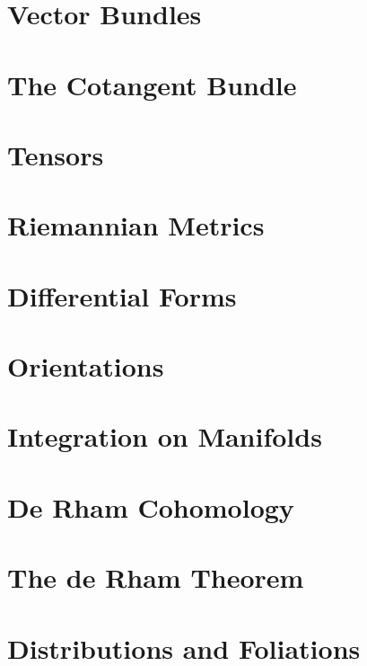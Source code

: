 \chapter{Vector Bundles}
\label{chap:vector-bundles}


\chapter{The Cotangent Bundle}
\label{chap:cotangent-bundle}


\chapter{Tensors}
\label{chap:tensors}


\chapter{Riemannian Metrics}
\label{chap:riemannian-metrics}


\chapter{Differential Forms}
\label{chap:differential-forms}


\chapter{Orientations}
\label{chap:orientations}


\chapter{Integration on Manifolds}
\label{chap:integration-on-manifolds}


\chapter{De Rham Cohomology}
\label{chap:de-rham-cohomology}


\chapter{The de Rham Theorem}
\label{chap:de-rham-theorem}


\chapter{Distributions and Foliations}
\label{chap:distributions-and-foliations}


